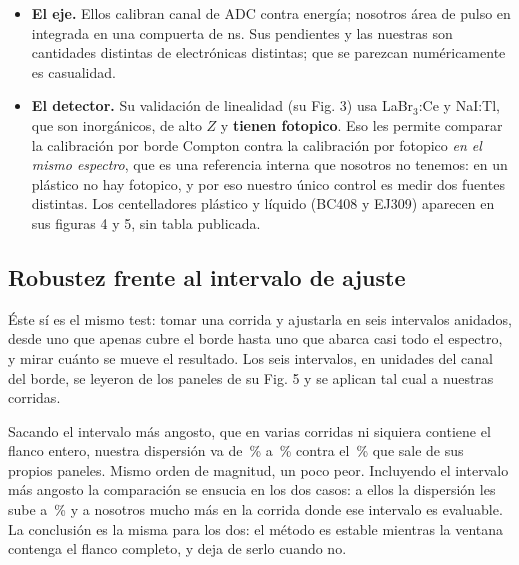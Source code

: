 \documentclass[11pt,a4paper]{article}
\begin{document}
\begin{itemize}
\item \textbf{El eje.} Ellos calibran canal de ADC contra energía; nosotros
      área de pulso en \mVns{} integrada en una compuerta de \PostFijo{} ns.
      Sus pendientes y las nuestras son cantidades distintas de electrónicas
      distintas; que se parezcan numéricamente es casualidad.
\item \textbf{El detector.} Su validación de linealidad (su Fig. 3) usa
      LaBr$_3$:Ce y NaI:Tl, que son inorgánicos, de alto $Z$ y \textbf{tienen
      fotopico}. Eso les permite comparar la calibración por borde Compton
      contra la calibración por fotopico \emph{en el mismo espectro}, que es
      una referencia interna que nosotros no tenemos: en un plástico no hay
      fotopico, y por eso nuestro único control es medir dos fuentes distintas.
      Los centelladores plástico y líquido (BC408 y EJ309) aparecen en sus
      figuras 4 y 5, sin tabla publicada.
\end{itemize}

\subsection{Robustez frente al intervalo de ajuste}

Éste sí es el mismo test: tomar una corrida y ajustarla en seis intervalos
anidados, desde uno que apenas cubre el borde hasta uno que abarca casi todo el
espectro, y mirar cuánto se mueve el resultado. Los seis intervalos, en
unidades del canal del borde, se leyeron de los paneles de su Fig. 5 y se
aplican tal cual a nuestras corridas.

\begin{table}[htbp]
\centering
\caption{El test de la Fig. 5 del paper, sobre nuestras corridas y sobre la
suya.}
\label{tab:robustez}
{\small}
\end{table}

Sacando el intervalo más angosto, que en varias corridas ni siquiera contiene
el flanco entero, nuestra dispersión va de \RobustezNuestraMin\,\% a
\RobustezNuestraMax\,\% contra el \RobustezPaperSinAngosta\,\% que sale de sus
propios paneles. Mismo orden de magnitud, un poco peor. Incluyendo el intervalo
más angosto la comparación se ensucia en los dos casos: a ellos la dispersión
les sube a \RobustezPaper\,\% y a nosotros mucho más en la corrida donde ese
intervalo es evaluable. La conclusión es la misma para los dos: el método es
estable mientras la ventana contenga el flanco completo, y deja de serlo cuando
no.
\end{document}
